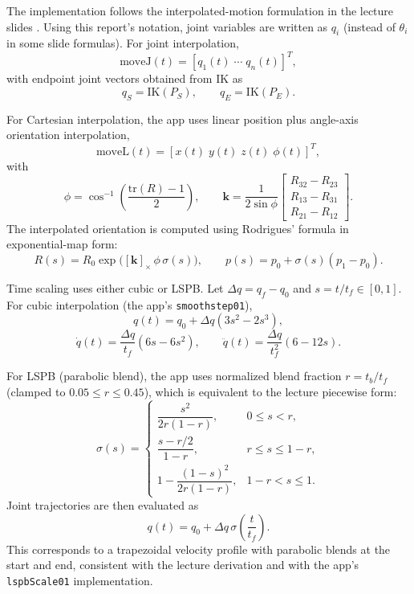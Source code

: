 \documentclass[conference]{IEEEtran}
\begin{document}
The implementation follows the interpolated-motion formulation in the lecture slides \cite{me7751_l4}. Using this report's notation, joint variables are written as $q_i$ (instead of $\theta_i$ in some slide formulas). For joint interpolation,
\begin{equation}
\mathrm{moveJ}(t)=\left[q_1(t)\;\cdots\;q_n(t)\right]^T,
\end{equation}
with endpoint joint vectors obtained from IK as
\begin{equation}
q_S=\mathrm{IK}(P_S),\qquad q_E=\mathrm{IK}(P_E).
\end{equation}

For Cartesian interpolation, the app uses linear position plus angle-axis orientation interpolation,
\begin{equation}
\mathrm{moveL}(t)=\left[x(t)\;y(t)\;z(t)\;\phi(t)\right]^T,
\end{equation}
with
\begin{equation}
\phi=\cos^{-1}\!\left(\frac{\mathrm{tr}(R)-1}{2}\right),\qquad
\mathbf{k}=\frac{1}{2\sin\phi}\begin{bmatrix}R_{32}-R_{23}\\R_{13}-R_{31}\\R_{21}-R_{12}\end{bmatrix}.
\end{equation}
The interpolated orientation is computed using Rodrigues' formula in exponential-map form:
\begin{equation}
R(s)=R_0\exp\!\big([\mathbf{k}]_\times\,\phi\,\sigma(s)\big),\qquad p(s)=p_0+\sigma(s)(p_1-p_0).
\end{equation}

Time scaling uses either cubic or LSPB. Let $\Delta q=q_f-q_0$ and $s=t/t_f\in[0,1]$.
For cubic interpolation (the app's \texttt{smoothstep01}),
\begin{equation}
q(t)=q_0+\Delta q\left(3s^2-2s^3\right),
\end{equation}
\begin{equation}
\dot q(t)=\frac{\Delta q}{t_f}\left(6s-6s^2\right), \qquad
\ddot q(t)=\frac{\Delta q}{t_f^2}\left(6-12s\right).
\end{equation}

For LSPB (parabolic blend), the app uses normalized blend fraction $r=t_b/t_f$ (clamped to $0.05\le r\le0.45$), which is equivalent to the lecture piecewise form:
\begin{equation}
\sigma(s)=
\begin{cases}
\dfrac{s^2}{2r(1-r)}, & 0\le s<r,\\[4pt]
\dfrac{s-r/2}{1-r}, & r\le s\le 1-r,\\[4pt]
1-\dfrac{(1-s)^2}{2r(1-r)}, & 1-r<s\le1.
\end{cases}
\end{equation}
Joint trajectories are then evaluated as
\begin{equation}
q(t)=q_0+\Delta q\,\sigma\!\left(\frac{t}{t_f}\right).
\end{equation}
This corresponds to a trapezoidal velocity profile with parabolic blends at the start and end, consistent with the lecture derivation and with the app's \texttt{lspbScale01} implementation.
\end{document}
